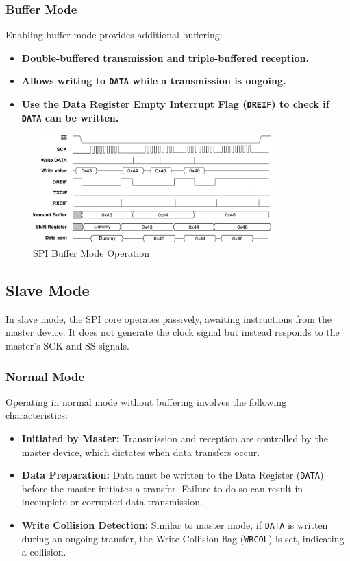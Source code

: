 \subsubsection{Buffer Mode}
Enabling buffer mode provides additional buffering:

\begin{itemize}
    \item \textbf{Double-buffered transmission and triple-buffered reception.}
    \item \textbf{Allows writing to \texttt{DATA} while a transmission is ongoing.}
    \item \textbf{Use the Data Register Empty Interrupt Flag (\texttt{DREIF}) to check if \texttt{DATA} can be written.}
\end{itemize}

\begin{figure}[H]
    \centering
    \includegraphics[width=0.85\textwidth]{images/spi_buffer_mode.png}
    \caption{SPI Buffer Mode Operation}
    \label{fig:spi_buffer_mode}
\end{figure}

\subsection{Slave Mode}
In slave mode, the SPI core operates passively, awaiting instructions from the master device. It does not generate the clock signal but instead responds to the master's SCK and SS signals.

\subsubsection{Normal Mode}
Operating in normal mode without buffering involves the following characteristics:

\begin{itemize}
    \item \textbf{Initiated by Master:} Transmission and reception are controlled by the master device, which dictates when data transfers occur.
    \item \textbf{Data Preparation:} Data must be written to the Data Register (\texttt{DATA}) before the master initiates a transfer. Failure to do so can result in incomplete or corrupted data transmission.
    \item \textbf{Write Collision Detection:} Similar to master mode, if \texttt{DATA} is written during an ongoing transfer, the Write Collision flag (\texttt{WRCOL}) is set, indicating a collision.
\end{itemize}

